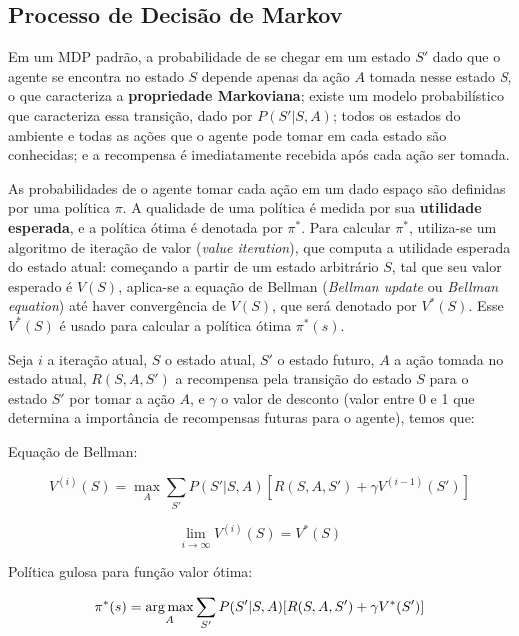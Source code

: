 \subsection{Processo de Decisão de Markov}
\label{sec:mdp}

Em um MDP padrão, a probabilidade de se chegar em um estado $S'$ dado que o agente se encontra no estado $S$ depende apenas da ação $A$ tomada nesse estado \textit{S}, o que caracteriza a \textbf{propriedade Markoviana}; existe um modelo probabilístico que caracteriza essa transição, dado por $P(S'|S,A)$; todos os estados do ambiente e todas as ações que o agente pode tomar em cada estado são conhecidas; e a recompensa é imediatamente recebida após cada ação ser tomada.

As probabilidades de o agente tomar cada ação em um dado espaço são definidas por uma política $\pi$. A qualidade de uma política é medida por sua \textbf{utilidade esperada}, e a política ótima é denotada por $\pi^{*}$. Para calcular $\pi^{*}$, utiliza-se um algoritmo de iteração de valor (\textit{value iteration}), que computa a utilidade esperada do estado atual: começando a partir de um estado arbitrário $S$, tal que seu valor esperado é $V(S)$, aplica-se a equação de Bellman (\textit{Bellman update} ou \textit{Bellman equation}) até haver convergência de $V(S)$, que será denotado por $V^{*}(S)$. Esse $V^{*}(S)$ é usado para calcular a política ótima $\pi^{*}(s)$.

Seja $i$ a iteração atual, $S$ o estado atual, $S'$ o estado futuro, $A$ a ação tomada no estado atual, $R(S,A,S')$ a recompensa pela transição do estado $S$ para o estado $S'$ por tomar a ação $A$, e $\gamma$ o valor de desconto (valor entre 0 e 1 que determina a importância de recompensas futuras para o agente), temos que:

Equação de Bellman:

\begin{equation} \label{eq:bellman}
V^{(i)}(S) = \max_{A}\sum_{S'}P(S'|S,A)[R(S,A,S') + \gamma V^{(i-1)}(S')]
\end{equation}

\begin{equation} \label{eq:qvalue}
\lim_{i\to\infty} V^{(i)}(S) = V^{*}(S)
\end{equation}

Política gulosa para função valor ótima:

\begin{equation} \label{eq:opt_pol}
\pi^{*}(s) = \operatorname*{arg\,max}_{A}\sum_{S'}P(S'|S,A)[R(S,A,S') + \gamma V^{*}(S')]
\end{equation}

